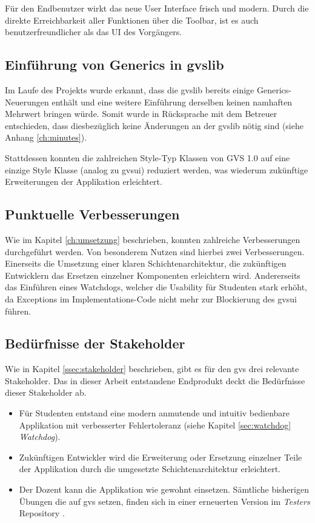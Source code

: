 \documentclass[11pt,a4paper,english,oneside]{book}
\numberwithin{equation}{chapter}
\begin{document}
	Für den Endbenutzer wirkt das neue User Interface frisch und modern. Durch die direkte Erreichbarkeit aller Funktionen über die Toolbar, ist es auch benutzerfreundlicher als das UI des Vorgängers.
	
	\subsection{Einführung von Generics in \gls{gvslib}}
	Im Laufe des Projekts wurde erkannt, dass die \gls{gvslib} bereits einige Generics-Neuerungen enthält und eine weitere Einführung derselben keinen namhaften Mehrwert bringen würde. Somit wurde in Rücksprache mit dem Betreuer entschieden, dass diesbezüglich keine Änderungen an der \gls{gvslib} nötig sind (siehe Anhang \ref{ch:minutes}).
	
	Stattdessen konnten die zahlreichen Style-Typ Klassen von GVS 1.0 auf eine einzige Style Klasse (analog zu \gls{gvsui}) reduziert werden, was wiederum zukünftige Erweiterungen der Applikation erleichtert.
	
	\subsection{Punktuelle Verbesserungen}
	Wie im Kapitel \ref{ch:umsetzung} beschrieben, konnten zahlreiche Verbesserungen durchgeführt werden. Von besonderem Nutzen sind hierbei zwei Verbesserungen. Einerseits die Umsetzung einer klaren Schichtenarchitektur, die zukünftigen Entwicklern das Ersetzen einzelner Komponenten erleichtern wird. Andererseits das Einführen eines Watchdogs, welcher die Usability für Studenten stark erhöht, da Exceptions im Implementations-Code nicht mehr zur Blockierung des \gls{gvsui} führen.
	
	\subsection{Bedürfnisse der Stakeholder}
	Wie in Kapitel \ref{ssec:stakeholder} beschrieben, gibt es für den \gls{gvs} drei relevante Stakeholder. Das in dieser Arbeit entstandene Endprodukt deckt die Bedürfnisse dieser Stakeholder ab.
	
	\begin{itemize}
		\item Für Studenten entstand eine modern anmutende und intuitiv bedienbare Applikation mit verbesserter Fehlertoleranz (siehe Kapitel \ref{sec:watchdog} \textit{Watchdog}).
		\item Zukünftigen Entwickler wird die Erweiterung oder Ersetzung einzelner Teile der Applikation durch die umgesetzte Schichtenarchitektur erleichtert.
		\item Der Dozent kann die Applikation wie gewohnt einsetzen. Sämtliche bisherigen Übungen die auf \gls{gvs} setzen, finden sich in einer erneuerten Version im \textit{Testers} Repository \cite{gvs-tester}.
	\end{itemize}
	
\end{document}
